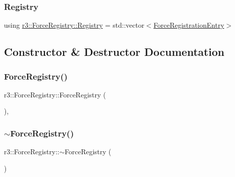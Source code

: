 \subsubsection{\texorpdfstring{Registry}{Registry}}
{\footnotesize\ttfamily using \mbox{\hyperlink{classr3_1_1_force_registry_a91449a71b1a33d773ef787ae56ae9b2d}{r3\+::\+Force\+Registry\+::\+Registry}} =  std\+::vector$<$\mbox{\hyperlink{structr3_1_1_force_registry_1_1_force_registration_entry}{Force\+Registration\+Entry}}$>$}



\subsection{Constructor \& Destructor Documentation}
\mbox{\label{classr3_1_1_force_registry_a6830132c53a756ebf3e6621195f51b17}} 
\subsubsection{\texorpdfstring{Force\+Registry()}{ForceRegistry()}}
{\footnotesize\ttfamily r3\+::\+Force\+Registry\+::\+Force\+Registry (\begin{DoxyParamCaption}{ }\end{DoxyParamCaption})\hspace{0.3cm}{\ttfamily [explicit]}, {\ttfamily [default]}}

\mbox{\label{classr3_1_1_force_registry_a322cdf54468a6f59610562a7bfc2e60d}} 
\subsubsection{\texorpdfstring{$\sim$\+Force\+Registry()}{~ForceRegistry()}}
{\footnotesize\ttfamily r3\+::\+Force\+Registry\+::$\sim$\+Force\+Registry (\begin{DoxyParamCaption}{ }\end{DoxyParamCaption})\hspace{0.3cm}{\ttfamily [default]}}



